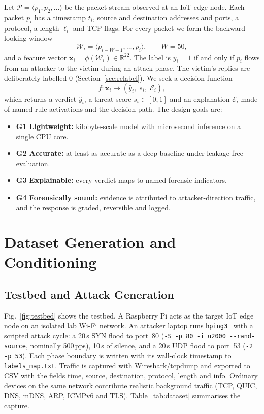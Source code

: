 \documentclass[conference]{IEEEtran}
\begin{document}
Let $\mathcal{P}=\langle p_1,p_2,\dots\rangle$ be the packet stream observed at an IoT edge node. Each packet $p_i$ has a timestamp $t_i$, source and destination addresses and ports, a protocol, a length $\ell_i$ and TCP flags. For every packet we form the backward-looking window
\begin{equation}
  \mathcal{W}_i=\langle p_{i-W+1},\dots,p_i\rangle,\qquad W=50,
  \label{eq:window}
\end{equation}
and a feature vector $\mathbf{x}_i=\phi(\mathcal{W}_i)\in\mathbb{R}^{22}$. The label is $y_i=1$ if and only if $p_i$ flows from an attacker to the victim during an attack phase. The victim's replies are deliberately labelled $0$ (Section~\ref{sec:relabel}). We seek a decision function
\begin{equation}
  f:\mathbf{x}_i\mapsto(\hat{y}_i,\;s_i,\;\mathcal{E}_i),
\end{equation}
which returns a verdict $\hat{y}_i$, a threat score $s_i\in[0,1]$ and an explanation $\mathcal{E}_i$ made of named rule activations and the decision path. The design goals are:
\begin{itemize}
  \item \textbf{G1 Lightweight:} kilobyte-scale model with microsecond inference on a single CPU core.
  \item \textbf{G2 Accurate:} at least as accurate as a deep baseline under leakage-free evaluation.
  \item \textbf{G3 Explainable:} every verdict maps to named forensic indicators.
  \item \textbf{G4 Forensically sound:} evidence is attributed to attacker-direction traffic, and the response is graded, reversible and logged.
\end{itemize}

\section{Dataset Generation and Conditioning}
\label{sec:data}

\subsection{Testbed and Attack Generation}
Fig.~\ref{fig:testbed} shows the testbed. A Raspberry Pi acts as the target IoT edge node on an isolated lab Wi-Fi network. An attacker laptop runs \texttt{hping3}~\cite{hping3} with a scripted attack cycle: a 20\,s SYN flood to port~80 (\texttt{-S -p 80 -i u2000 -{}-rand-source}, nominally 500\,pps), 10\,s of silence, and a 20\,s UDP flood to port~53 (\texttt{-2 -p 53}). Each phase boundary is written with its wall-clock timestamp to \texttt{labels\_map.txt}. Traffic is captured with Wireshark/tcpdump and exported to CSV with the fields time, source, destination, protocol, length and info. Ordinary devices on the same network contribute realistic background traffic (TCP, QUIC, DNS, mDNS, ARP, ICMPv6 and TLS). Table~\ref{tab:dataset} summarises the capture.
\end{document}

